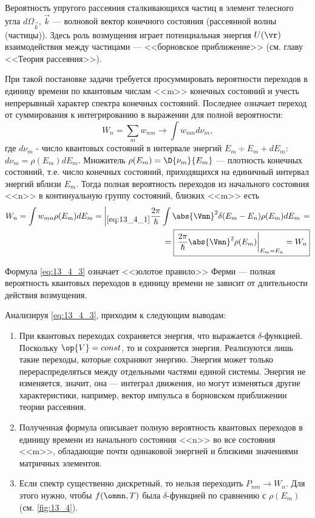 \begin{exmpl}
Вероятность упругого рассеяния сталкивающихся частиц в элемент телесного угла $d\Omega_{\vec k}$, $\vec k$ --- волновой вектор конечного состояния (рассеянной волны (частицы)). Здесь роль возмущения играет потенциальная энергия $U(\vr)$ взаимодействия между частицами --- <<борновское приближение>> (см. главу  <<Теория рассеяния>>).
\end{exmpl}

При такой постановке задачи требуется просуммировать вероятности переходов в единицу времени по квантовым числам <<m>> конечных состояний и учесть непрерывный характер спектра конечных состояний. Последнее означает переход от суммирования к интегрированию в выражении для полной вероятности:
$$
W_n = \sum_m w_{nm} \to \int w_{mn} d \nu_m,
$$
где $d \nu_m$ - число квантовых состояний в интервале энергий $E_m \div E_m + dE_m$: \newline $\boxed{d \nu_m = \rho(E_m) dE_m}$. Множитель $\rho(E_m) = \D{\nu_m}{E_m}$ --- плотность конечных состояний, т.е. число конечных состояний, приходящихся на единичный интервал энергий вблизи $E_m$. Тогда полная вероятность переходов из начального состояния <<n>> в континуальную группу состояний, близких <<m>> есть 
\begin{eqnarray}
W_n = \int w_{mn} \rho(E_m)dE_m = \left |_{\eqref{eq:13_4_1}} \dfrac{2\pi}{\hbar} \int \abs{\Vmn}^2 \delta(E_m - E_n) \rho(E_m)dE_m \right .= \nonumber \\
\label{eq:13_4_3} = \boxed{ \left. \frac{2\pi}{\hbar} \abs{\Vmn}^2 \rho(E_m) \right|_{E_m = E_n} = W_n}
\end{eqnarray}

Формула \eqref{eq:13_4_3} означает <<золотое правило>> Ферми --- полная вероятность квантовых переходов в единицу времени не зависит от длительности действия возмущения.

Анализируя \eqref{eq:13_4_3}, приходим к следующим выводам:
\begin{enumerate}
\item При квантовых переходах сохраняется энергия, что выражается $\delta$-функцией. Поскольку $\op{V} = const$, то и сохраняется энергия. Реализуются лишь такие переходы, которые сохраняют энергию. Энергия может только перераспределяться между отдельными частями единой системы. Энергия не изменяется, значит, она --- интеграл движения, но могут изменяться другие характеристики, например, вектор импульса в борновском приближении теории рассеяния.

\item Полученная формула описывает полную вероятность квантовых переходов в единицу времени из начального состояния <<n>> во все состояния <<m>>, обладающие почти одинаковой энергией и близкими значениями матричных элементов. 

\item Если спектр существенно дискретный, то нельзя переходить $P_{nm} \to W_n$. Для этого нужно, чтобы $f(\ommn, T)$ была $\delta$-функцией по сравнению с $\rho(E_m)$ (см. \autoref{fig:13_4}). 
\end{enumerate}

